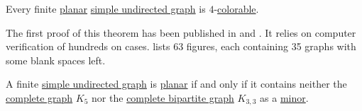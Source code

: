 \begin{theorem}\label{thm:four_color_theorem}
  Every finite \hyperref[def:planar_graph]{planar} \hyperref[def:undirected_graph]{simple undirected graph} is \( 4 \)-\hyperref[def:graph_coloring/colorable]{colorable}.
\end{theorem}
\begin{comments}
  \item The first proof of this theorem has been published in \cite{AppelHaken1977FourColoringPartI} and \cite{AppelHakenKoch1977FourColoringPartII}. It relies on computer verification of hundreds on cases. \cite{AppelHakenKoch1977FourColoringPartII} lists 63 figures, each containing 35 graphs with some blank spaces left.
\end{comments}

\begin{theorem}\label{thm:wagners_theorem}
  A finite \hyperref[def:undirected_graph]{simple undirected graph} is \hyperref[def:planar_graph]{planar} if and only if it contains neither the \hyperref[def:complete_graph]{complete graph} \( K_5 \) nor the \hyperref[def:complete_graph]{complete bipartite graph} \( K_{3,3} \) as a \hyperref[def:graph_minor]{minor}.
\end{theorem}
